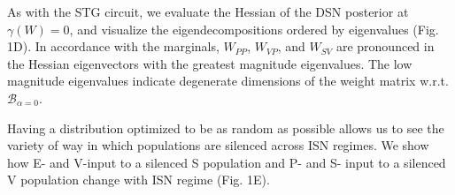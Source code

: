 As with the STG circuit, we evaluate the Hessian of the DSN posterior at $\gamma(W)=0$, and visualize the eigendecompositions ordered by eigenvalues (Fig. 1D).  In accordance with the marginals, $W_{PP}$, $W_{VP}$, and $W_{SV}$ are pronounced in the Hessian eigenvectors with the greatest magnitude eigenvalues.  The low magnitude eigenvalues indicate degenerate  dimensions of the weight matrix w.r.t. $\mathcal{B}_{\alpha=0}$.

Having a distribution optimized to be as random as possible allows us to see the variety of way in which populations are silenced across ISN regimes.  We show how E- and V-input to a silenced S population and P- and S- input to a silenced V population change with ISN regime (Fig. 1E).





